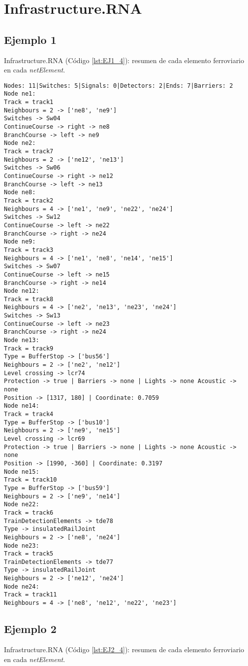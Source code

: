 \chapter{Infrastructure.RNA}
	\label{sec:infrastructureRNA}
	
	\section{Ejemplo 1}
		Infrastructure.RNA (Código \ref{lst:EJ1_4}): resumen de cada elemento ferroviario en cada \textit{netElement}.
		
		\begin{lstlisting}[language = {}, caption = Infrastructure.RNA, label = {lst:EJ1_4}]
Nodes: 11|Switches: 5|Signals: 0|Detectors: 2|Ends: 7|Barriers: 2
Node ne1:
Track = track1
Neighbours = 2 -> ['ne8', 'ne9']
Switches -> Sw04
ContinueCourse -> right -> ne8
BranchCourse -> left -> ne9
Node ne2:
Track = track7
Neighbours = 2 -> ['ne12', 'ne13']
Switches -> Sw06
ContinueCourse -> right -> ne12
BranchCourse -> left -> ne13
Node ne8:
Track = track2
Neighbours = 4 -> ['ne1', 'ne9', 'ne22', 'ne24']
Switches -> Sw12
ContinueCourse -> left -> ne22
BranchCourse -> right -> ne24
Node ne9:
Track = track3
Neighbours = 4 -> ['ne1', 'ne8', 'ne14', 'ne15']
Switches -> Sw07
ContinueCourse -> left -> ne15
BranchCourse -> right -> ne14
Node ne12:
Track = track8
Neighbours = 4 -> ['ne2', 'ne13', 'ne23', 'ne24']
Switches -> Sw13
ContinueCourse -> left -> ne23
BranchCourse -> right -> ne24
Node ne13:
Track = track9
Type = BufferStop -> ['bus56']
Neighbours = 2 -> ['ne2', 'ne12']
Level crossing -> lcr74
Protection -> true | Barriers -> none | Lights -> none Acoustic -> none
Position -> [1317, 180] | Coordinate: 0.7059
Node ne14:
Track = track4
Type = BufferStop -> ['bus10']
Neighbours = 2 -> ['ne9', 'ne15']
Level crossing -> lcr69
Protection -> true | Barriers -> none | Lights -> none Acoustic -> none
Position -> [1990, -360] | Coordinate: 0.3197
Node ne15:
Track = track10
Type = BufferStop -> ['bus59']
Neighbours = 2 -> ['ne9', 'ne14']
Node ne22:
Track = track6
TrainDetectionElements -> tde78
Type -> insulatedRailJoint
Neighbours = 2 -> ['ne8', 'ne24']
Node ne23:
Track = track5
TrainDetectionElements -> tde77
Type -> insulatedRailJoint
Neighbours = 2 -> ['ne12', 'ne24']
Node ne24:
Track = track11
Neighbours = 4 -> ['ne8', 'ne12', 'ne22', 'ne23']
		\end{lstlisting}	
	\section{Ejemplo 2}
	Infrastructure.RNA (Código \ref{lst:EJ2_4}): resumen de cada elemento ferroviario en cada \textit{netElement}.
	

